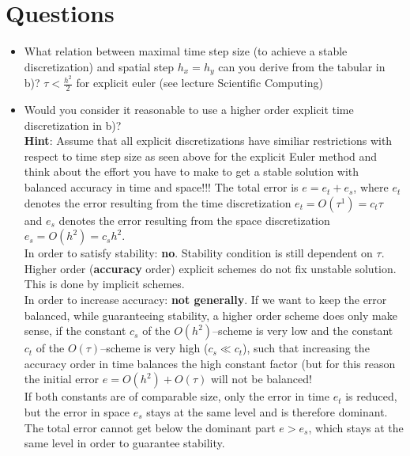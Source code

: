 \documentclass[12pt,a4paper]{scrreprt}
\begin{document}
\section*{Questions}
\begin{itemize}
\item What relation between maximal time step size (to achieve a stable discretization) and spatial step $h_x = h_y$ can you derive from the tabular in b)?\newline
{\footnotesize
$\tau<\frac{h^2}{2}$ for explicit euler (see lecture Scientific Computing)
}

\item Would you consider it reasonable to use a higher order explicit time discretization in
b)?\\
\textbf{Hint}: Assume that all explicit discretizations have similiar restrictions with respect to time step size as seen above for the explicit Euler method and think about the effort
you have to make to get a stable solution with balanced accuracy in time and space!!!\newline
{\footnotesize
The total error is $e=e_t+e_s$, where $e_t$ denotes the error resulting from the time discretization $e_t=O\left(\tau^1\right)=c_t \tau$ and $e_s$ denotes the error resulting from the space discretization $e_s=O\left(h^2\right)=c_s h^2$.\\
In order to satisfy stability: \textbf{no}. Stability condition is still dependent on $\tau$. Higher order (\textbf{accuracy} order) explicit schemes do not fix unstable solution. This is done by implicit schemes.\\
In order to increase accuracy: \textbf{not generally}. If we want to keep the error balanced, while guaranteeing stability, a higher order scheme does only make sense, if the constant $c_s$ of the $O\left(h^2\right)$--scheme is very low and the constant $c_t$ of the $O\left(\tau\right)$--scheme is very high ($c_s \ll c_t$), such that increasing the accuracy order in time balances the high constant factor (but for this reason the initial error $e=O(h^2)+O(\tau)$ will not be balanced!\\
If both constants are of comparable size, only the error in time $e_t$ is reduced, but the error in space $e_s$ stays at the same level and is therefore dominant. The total error cannot get below the dominant part $e>e_s$, which stays at the same level in order to guarantee stability.
}


\end{itemize}
\end{document}
